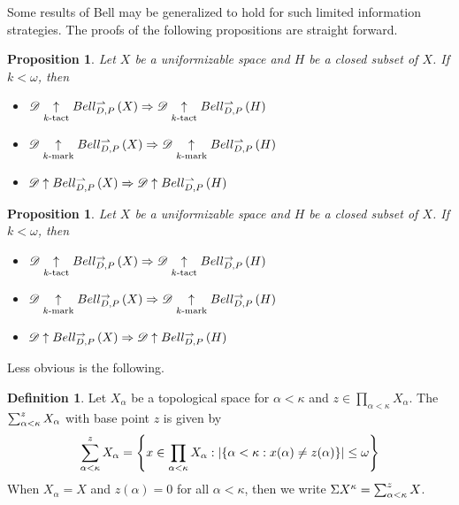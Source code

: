 \documentclass{amsart}
\newtheorem{proposition}[theorem]{Proposition}
\theoremstyle{definition}
\newtheorem{definition}[theorem]{Definition}
\begin{document}
  Some results of Bell may be generalized to hold for such limited information
  strategies. The proofs of the following propositions are straight forward.

  \begin{proposition}
    Let \(X\) be a uniformizable space and \(H\) be a closed subset of \(X\).
    If \(k<\omega\), then
    \begin{itemize}
      \item
       \(
          \mathscr{D} \underset{k\text{-tact}}{\uparrow} Bell_{D,P}^{\rightharpoonup}\left({X}\right)
            \Rightarrow
          \mathscr{D} \underset{k\text{-tact}}{\uparrow} Bell_{D,P}^{\rightharpoonup}\left({H}\right)
       \)
      \item
       \(
          \mathscr{D} \underset{k\text{-mark}}{\uparrow} Bell_{D,P}^{\rightharpoonup}\left({X}\right)
            \Rightarrow
          \mathscr{D} \underset{k\text{-mark}}{\uparrow} Bell_{D,P}^{\rightharpoonup}\left({H}\right)
       \)
      \item
       \(
          \mathscr{D} \uparrow Bell_{D,P}^{\rightharpoonup}\left({X}\right)
            \Rightarrow
          \mathscr{D} \uparrow Bell_{D,P}^{\rightharpoonup}\left({H}\right)
       \)
    \end{itemize}
  \end{proposition}

  \begin{proposition}
    Let \(X\) be a uniformizable space and \(H\) be a closed subset of \(X\).
    If \(k<\omega\), then
    \begin{itemize}
      \item
       \(
          \mathscr{D} \underset{k\text{-tact}}{\uparrow} Bell_{D,P}^{\to}\left({X}\right)
            \Rightarrow
          \mathscr{D} \underset{k\text{-tact}}{\uparrow} Bell_{D,P}^{\to}\left({H}\right)
       \)
      \item
       \(
          \mathscr{D} \underset{k\text{-mark}}{\uparrow} Bell_{D,P}^{\to}\left({X}\right)
            \Rightarrow
          \mathscr{D} \underset{k\text{-mark}}{\uparrow} Bell_{D,P}^{\to}\left({H}\right)
       \)
      \item
       \(
          \mathscr{D} \uparrow Bell_{D,P}^{\to}\left({X}\right)
            \Rightarrow
          \mathscr{D} \uparrow Bell_{D,P}^{\to}\left({H}\right)
       \)
    \end{itemize}
  \end{proposition}

  Less obvious is the following.

  \begin{definition}
    Let \(X_\alpha\) be a topological space for \(\alpha<\kappa\)
    and \(z\in\prod_{\alpha<\kappa}X_\alpha\).
    The  \(\sum_{\alpha<\kappa}^{z}X_\alpha\)
    with base point \(z\) is given by
    \[
      \sum_{\alpha<\kappa}^{z}X_\alpha
        =
      \left\{
        x\in \prod_{\alpha<\kappa}X_\alpha
      :
        |\{\alpha<\kappa:x(\alpha)\not=z(\alpha)\}|\leq\omega
      \right\}
    \]
    When \(X_\alpha=X\) and \(z(\alpha)=0\) for all \(\alpha<\kappa\),
    then we write \({\Sigma X^\kappa}=\sum_{\alpha<\kappa}^z X\).
  \end{definition}
\end{document}
